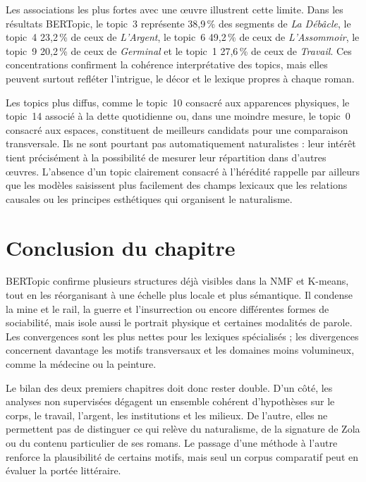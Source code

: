 Les associations les plus fortes avec une œuvre illustrent cette limite. Dans les résultats BERTopic, le topic~3 représente 38,9\,\% des segments de \textit{La Débâcle}, le topic~4 23,2\,\% de ceux de \textit{L'Argent}, le topic~6 49,2\,\% de ceux de \textit{L'Assommoir}, le topic~9 20,2\,\% de ceux de \textit{Germinal} et le topic~1 27,6\,\% de ceux de \textit{Travail}. Ces concentrations confirment la cohérence interprétative des topics, mais elles peuvent surtout refléter l'intrigue, le décor et le lexique propres à chaque roman.

Les topics plus diffus, comme le topic~10 consacré aux apparences physiques, le topic~14 associé à la dette quotidienne ou, dans une moindre mesure, le topic~0 consacré aux espaces, constituent de meilleurs candidats pour une comparaison transversale. Ils ne sont pourtant pas automatiquement naturalistes : leur intérêt tient précisément à la possibilité de mesurer leur répartition dans d'autres œuvres. L'absence d'un topic clairement consacré à l'hérédité rappelle par ailleurs que les modèles saisissent plus facilement des champs lexicaux que les relations causales ou les principes esthétiques qui organisent le naturalisme.

\section*{Conclusion du chapitre}

BERTopic confirme plusieurs structures déjà visibles dans la NMF et K-means, tout en les réorganisant à une échelle plus locale et plus sémantique. Il condense la mine et le rail, la guerre et l'insurrection ou encore différentes formes de sociabilité, mais isole aussi le portrait physique et certaines modalités de parole. Les convergences sont les plus nettes pour les lexiques spécialisés ; les divergences concernent davantage les motifs transversaux et les domaines moins volumineux, comme la médecine ou la peinture.

Le bilan des deux premiers chapitres doit donc rester double. D'un côté, les analyses non supervisées dégagent un ensemble cohérent d'hypothèses sur le corps, le travail, l'argent, les institutions et les milieux. De l'autre, elles ne permettent pas de distinguer ce qui relève du naturalisme, de la signature de Zola ou du contenu particulier de ses romans. Le passage d'une méthode à l'autre renforce la plausibilité de certains motifs, mais seul un corpus comparatif peut en évaluer la portée littéraire.

